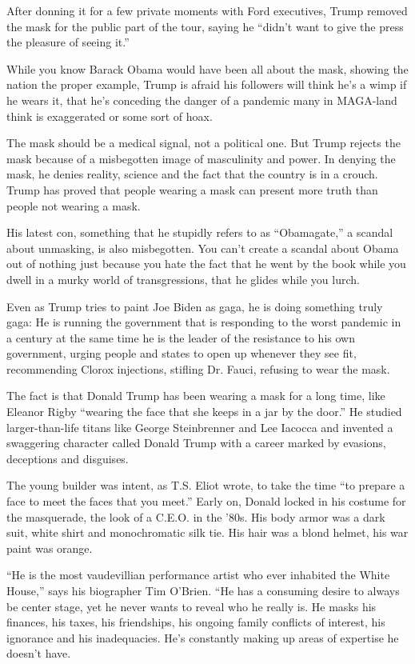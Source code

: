 After donning it for a few private moments with Ford executives, Trump
removed the mask for the public part of the tour, saying he ``didn't
want to give the press the pleasure of seeing it.''

While you know Barack Obama would have been all about the mask, showing
the nation the proper example, Trump is afraid his followers will think
he's a wimp if he wears it, that he's conceding the danger of a pandemic
many in MAGA-land think is exaggerated or some sort of hoax.

The mask should be a medical signal, not a political one. But Trump
rejects the mask because of a misbegotten image of masculinity and
power. In denying the mask, he denies reality, science and the fact that
the country is in a crouch. Trump has proved that people wearing a mask
can present more truth than people not wearing a mask.

His latest con, something that he stupidly refers to as ``Obamagate,'' a
scandal about unmasking, is also misbegotten. You can't create a scandal
about Obama out of nothing just because you hate the fact that he went
by the book while you dwell in a murky world of transgressions, that he
glides while you lurch.

Even as Trump tries to paint Joe Biden as gaga, he is doing something
truly gaga: He is running the government that is responding to the worst
pandemic in a century at the same time he is the leader of the
resistance to his own government, urging people and states to open up
whenever they see fit, recommending Clorox injections, stifling Dr.
Fauci, refusing to wear the mask.

The fact is that Donald Trump has been wearing a mask for a long time,
like Eleanor Rigby ``wearing the face that she keeps in a jar by the
door.'' He studied larger-than-life titans like George Steinbrenner and
Lee Iacocca and invented a swaggering character called Donald Trump with
a career marked by evasions, deceptions and disguises.

The young builder was intent, as T.S. Eliot wrote, to take the time ``to
prepare a face to meet the faces that you meet.'' Early on, Donald
locked in his costume for the masquerade, the look of a C.E.O. in the
'80s. His body armor was a dark suit, white shirt and monochromatic silk
tie. His hair was a blond helmet, his war paint was orange.

``He is the most vaudevillian performance artist who ever inhabited the
White House,'' says his biographer Tim O'Brien. ``He has a consuming
desire to always be center stage, yet he never wants to reveal who he
really is. He masks his finances, his taxes, his friendships, his
ongoing family conflicts of interest, his ignorance and his
inadequacies. He's constantly making up areas of expertise he doesn't
have.

